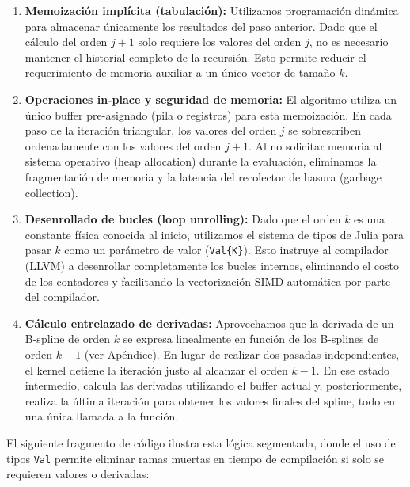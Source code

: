 \begin{enumerate}[label=\textbf{\Alph*.}, leftmargin=*]
    \item \textbf{Memoización implícita (tabulación):} Utilizamos programación dinámica para almacenar únicamente los resultados del paso anterior. Dado que el cálculo del orden \( j+1 \) solo requiere los valores del orden \( j \), no es necesario mantener el historial completo de la recursión. Esto permite reducir el requerimiento de memoria auxiliar a un único vector de tamaño \( k \).
    
    \item \textbf{Operaciones in-place y seguridad de memoria:} El algoritmo utiliza un único buffer pre-asignado (pila o registros) para esta memoización. En cada paso de la iteración triangular, los valores del orden \( j \) se sobrescriben ordenadamente con los valores del orden \( j+1 \). Al no solicitar memoria al sistema operativo (heap allocation) durante la evaluación, eliminamos la fragmentación de memoria y la latencia del recolector de basura (garbage collection).

    \item \textbf{Desenrollado de bucles (loop unrolling):} Dado que el orden \( k \) es una constante física conocida al inicio, utilizamos el sistema de tipos de Julia para pasar \( k \) como un parámetro de valor (\texttt{Val\{K\}}). Esto instruye al compilador (LLVM) a desenrollar completamente los bucles internos, eliminando el costo de los contadores y facilitando la vectorización SIMD automática por parte del compilador.

    \item \textbf{Cálculo entrelazado de derivadas:} Aprovechamos que la derivada de un B-spline de orden \( k \) se expresa linealmente en función de los B-splines de orden \( k-1 \) (ver Apéndice). En lugar de realizar dos pasadas independientes, el kernel detiene la iteración justo al alcanzar el orden \( k-1 \). En ese estado intermedio, calcula las derivadas utilizando el buffer actual y, posteriormente, realiza la última iteración para obtener los valores finales del spline, todo en una única llamada a la función.
\end{enumerate}

El siguiente fragmento de código ilustra esta lógica segmentada, donde el uso de tipos \texttt{Val} permite eliminar ramas muertas en tiempo de compilación si solo se requieren valores o derivadas:

